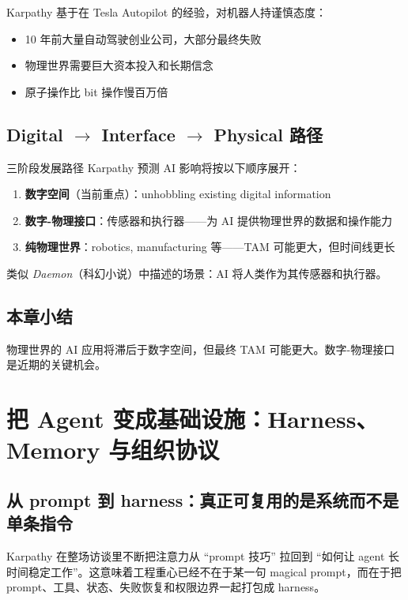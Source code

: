 \documentclass[a4paper]{article}
\begin{document}
Karpathy 基于在 Tesla Autopilot 的经验，对机器人持谨慎态度：
\begin{itemize}
    \item 10 年前大量自动驾驶创业公司，大部分最终失败
    \item 物理世界需要巨大资本投入和长期信念
    \item 原子操作比 bit 操作慢百万倍
\end{itemize}

\subsection{Digital $\rightarrow$ Interface $\rightarrow$ Physical 路径}

\begin{knowledgebox}{三阶段发展路径}
Karpathy 预测 AI 影响将按以下顺序展开：
\begin{enumerate}
    \item \textbf{数字空间}（当前重点）：unhobbling existing digital information
    \item \textbf{数字-物理接口}：传感器和执行器——为 AI 提供物理世界的数据和操作能力
    \item \textbf{纯物理世界}：robotics, manufacturing 等——TAM 可能更大，但时间线更长
\end{enumerate}
类似 \textit{Daemon}（科幻小说）中描述的场景：AI 将人类作为其传感器和执行器。
\end{knowledgebox}

\subsection{本章小结}

物理世界的 AI 应用将滞后于数字空间，但最终 TAM 可能更大。数字-物理接口是近期的关键机会。


\section{把 Agent 变成基础设施：Harness、Memory 与组织协议}

\subsection{从 prompt 到 harness：真正可复用的是系统而不是单条指令}
Karpathy 在整场访谈里不断把注意力从 ``prompt 技巧'' 拉回到 ``如何让 agent 长时间稳定工作''。这意味着工程重心已经不在于某一句 magical prompt，而在于把 prompt、工具、状态、失败恢复和权限边界一起打包成 harness。
\end{document}
